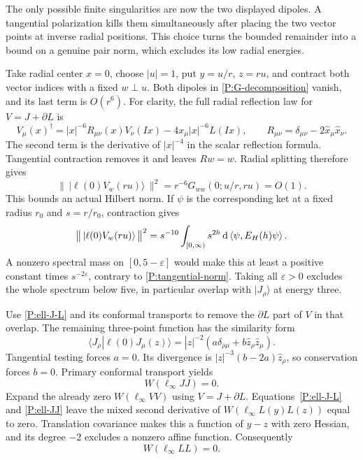 The only possible finite singularities are now the two displayed
dipoles.  A tangential polarization kills them simultaneously after
placing the two vector points at inverse radial positions.  This
choice turns the bounded remainder into a bound on a genuine pair
norm, which excludes its low radial energies.

Take radial center $x=0$, choose $|u|=1$, put $y=u/r$, $z=ru$, and
contract both vector indices with a fixed $w\perp u$.  Both dipoles
in \eqref{P:G-decomposition} vanish, and its last term is $O(r^6)$.
For clarity, the full radial reflection law for $V=J+\partial L$ is
\begin{equation}
 V_\mu(x)^\dagger
 =|x|^{-6}R_{\mu\nu}(x)V_\nu(Ix)
      -4x_\mu|x|^{-6}L(Ix),\qquad
 R_{\mu\nu}=\delta_{\mu\nu}-2\widehat x_\mu\widehat x_\nu.
 \label{P:V-reflection}
\end{equation}
The second term is the derivative of $|x|^{-4}$ in the scalar
reflection formula.  Tangential contraction removes it and leaves
$Rw=w$.  Radial splitting therefore gives
\begin{equation}
 \big\|\,|\ell(0)V_w(ru)\rangle\,\big\|^2
     =r^{-6}G_{ww}(0;u/r,ru)=O(1).
 \label{P:tangential-norm}
\end{equation}
This bounds an actual Hilbert norm.  If $\psi$ is the corresponding
ket at a fixed radius $r_0$ and $s=r/r_0$, contraction gives
\begin{equation}
 \big\|\,|\ell(0)V_w(ru)\rangle\,\big\|^2
    =s^{-10}\int_{[0,\infty)}s^{2h}\,
                   \mathrm d\left\langle\psi,E_H(h)\psi\right\rangle.
 \label{P:no-low-energy}
\end{equation}
A nonzero spectral mass on $[0,5-\varepsilon]$ would make this at
least a positive constant times $s^{-2\varepsilon}$, contrary to
\eqref{P:tangential-norm}.  Taking all $\varepsilon>0$ excludes the
whole spectrum below five, in particular overlap with
$|J_\rho\rangle$ at energy three.

Use \eqref{P:ell-J-L} and its conformal transports to remove the
$\partial L$ part of $V$ in that overlap.  The remaining three-point
function has the similarity form
\begin{equation}
 \langle J_\rho|\ell(0)J_\mu(z)\rangle
      =|z|^{-2}(a\delta_{\rho\mu}
                      +b\widehat z_\rho\widehat z_\mu).
 \label{P:ell-JJ-form}
\end{equation}
Tangential testing forces $a=0$.  Its divergence is
$|z|^{-3}(b-2a)\widehat z_\rho$, so conservation forces $b=0$.
Primary conformal transport yields
\begin{equation}
 W(\ell_\infty JJ)=0.
 \label{P:ell-JJ}
\end{equation}
Expand the already zero $W(\ell_\infty VV)$ using $V=J+\partial L$.
Equations~\eqref{P:ell-J-L} and \eqref{P:ell-JJ} leave the mixed
second derivative of $W(\ell_\infty L(y)L(z))$ equal to zero.
Translation covariance makes this a function of $y-z$ with zero
Hessian, and its degree $-2$ excludes a nonzero affine function.
Consequently
\begin{equation}
 W(\ell_\infty LL)=0.
 \label{P:ell-LL}
\end{equation}

